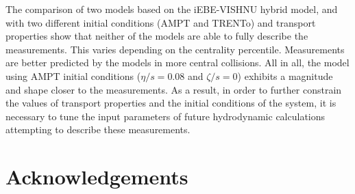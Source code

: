 \documentclass[ALICE,manyauthors]{cernphprep}
\begin{document}
The comparison of two models based on the iEBE-VISHNU hybrid model, and with two different initial conditions (AMPT and TRENTo) and transport properties show that neither of the models are able to fully describe the measurements. This varies depending on the centrality percentile. Measurements are better predicted by the models in more central collisions. All in all, the model using AMPT initial conditions ($\eta/s = 0.08$ and $\zeta/s =0$) exhibits a magnitude and shape closer to the measurements. As a result, in order to further constrain the values of transport properties and the initial conditions of the system, it is necessary to tune the input parameters of future hydrodynamic calculations attempting to describe these measurements.
%


\newenvironment{acknowledgement}{\relax}{\relax}
\begin{acknowledgement}
\section*{Acknowledgements}
%
\end{acknowledgement}

\newpage
\end{document}
